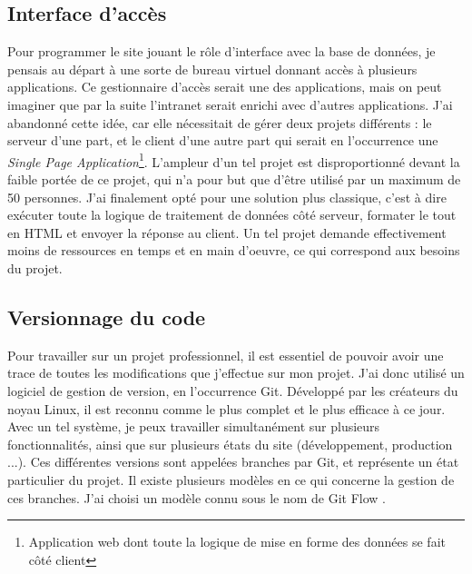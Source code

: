 \documentclass[a4paper,french,11pt,openany,oneside]{memoir}
\begin{document}
\subsection{Interface d'accès}

Pour programmer le site jouant le rôle d'interface avec la base de données, je pensais au départ à une sorte de bureau virtuel donnant accès à plusieurs applications. Ce gestionnaire d'accès serait une des applications, mais on peut imaginer que par la suite l'intranet serait enrichi avec d'autres applications. J'ai abandonné cette idée, car elle nécessitait de gérer deux projets différents : le serveur d'une part, et le client d'une autre part qui serait en l'occurrence une {\em Single Page Application}\footnote{Application web dont toute la logique de mise en forme des données se fait côté client}. L'ampleur d'un tel projet est disproportionné devant la faible portée de ce projet, qui n'a pour but que d'être utilisé par un maximum de 50 personnes. J'ai finalement opté pour une solution plus classique, c'est à dire exécuter toute la logique de traitement de données côté serveur, formater le tout en HTML et envoyer la réponse au client. Un tel projet demande effectivement moins de ressources en temps et en main d'oeuvre, ce qui correspond aux besoins du projet.

\subsection{Versionnage du code}

Pour travailler sur un projet professionnel, il est essentiel de pouvoir avoir une trace de toutes les modifications que j'effectue sur mon projet. J'ai donc utilisé un logiciel de gestion de version, en l'occurrence Git. Développé par les créateurs du noyau Linux, il est reconnu comme le plus complet et le plus efficace à ce jour. Avec un tel système, je peux travailler simultanément sur plusieurs fonctionnalités, ainsi que sur plusieurs états du site (développement, production ...). Ces différentes versions sont appelées \og branches \fg par Git, et représente un état particulier du projet. Il existe plusieurs modèles en ce qui concerne la gestion de ces branches. J'ai choisi un modèle connu sous le nom de \og Git Flow \fg.
\end{document}
